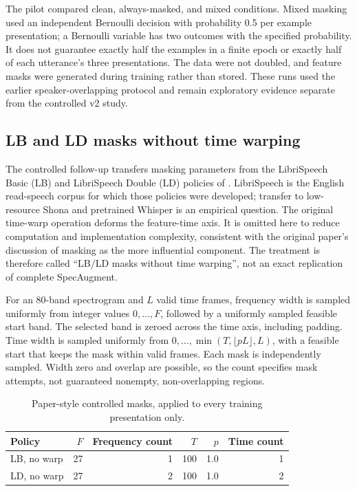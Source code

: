 \documentclass[12pt,a4paper]{report}
\begin{document}
The pilot compared clean, always-masked, and mixed conditions. Mixed masking used an independent Bernoulli decision with probability 0.5 per example presentation; a Bernoulli variable has two outcomes with the specified probability. It does not guarantee exactly half the examples in a finite epoch or exactly half of each utterance's three presentations. The data were not doubled, and feature masks were generated during training rather than stored. These runs used the earlier speaker-overlapping protocol and remain exploratory evidence separate from the controlled v2 study.

\subsection{LB and LD masks without time warping}

The controlled follow-up transfers masking parameters from the LibriSpeech Basic (LB) and LibriSpeech Double (LD) policies of \citet{Park2019}. LibriSpeech is the English read-speech corpus for which those policies were developed; transfer to low-resource Shona and pretrained Whisper is an empirical question. The original time-warp operation deforms the feature-time axis. It is omitted here to reduce computation and implementation complexity, consistent with the original paper's discussion of masking as the more influential component. The treatment is therefore called ``LB/LD masks without time warping'', not an exact replication of complete SpecAugment.

For an 80-band spectrogram and $L$ valid time frames, frequency width is sampled uniformly from integer values $0,\ldots,F$, followed by a uniformly sampled feasible start band. The selected band is zeroed across the time axis, including padding. Time width is sampled uniformly from $0,\ldots,\min(T,\lfloor pL\rfloor,L)$, with a feasible start that keeps the mask within valid frames. Each mask is independently sampled. Width zero and overlap are possible, so the count specifies mask attempts, not guaranteed nonempty, non-overlapping regions.

\begin{table}[htbp]\centering
\caption{Paper-style controlled masks, applied to every training presentation only.}\label{tab:masks}
\begin{tabular}{lrrrrr}\toprule Policy & $F$ & Frequency count & $T$ & $p$ & Time count\\\midrule
LB, no warp & 27 & 1 & 100 & 1.0 & 1\\
LD, no warp & 27 & 2 & 100 & 1.0 & 2\\\bottomrule
\end{tabular}\end{table}
\end{document}
